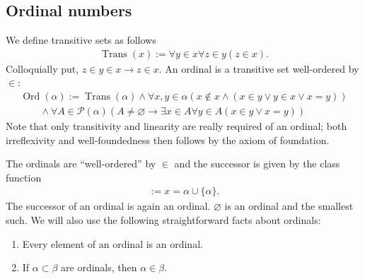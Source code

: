 \documentclass{scrartcl}
\theoremstyle{definition}
\theoremstyle{plain}
\theoremstyle{remark}
\newcommand{\limp}{\rightarrow}
\newcommand{\Pow}{\mathcal{P}}
\newcommand{\eqdef}{:=}
\DeclareMathOperator{\Trans}{Trans}
\DeclareMathOperator{\Ord}{Ord}
\begin{document}
\subsection{Ordinal numbers}
\label{subsec:ord}

We define transitive sets as follows
\begin{align*}
  \Trans(x) \eqdef \forall y \in x \forall z \in y (z \in x)\mbox{.}
\end{align*}
Colloquially put, $z \in y \in x \limp z \in x$. An ordinal is a transitive set well-ordered by $\in$:
\begin{align*}
  \Ord(\alpha) \eqdef \Trans(\alpha) \land \forall x, y \in \alpha (x \not\in x \land (x \in y \lor y \in x \lor x = y))\\
  \qquad \land \forall A \in \Pow(\alpha) (A \not= \varnothing \limp \exists x \in A \forall y \in A (x \in y \lor x = y))
\end{align*}
Note that only transitivity and linearity are really required of an ordinal; both irreflexivity and well-foundedness then follows by the axiom of foundation.

The ordinals are ``well-ordered'' by $\in$ and the successor is given by the class function
\begin{align*}
  [x = \alpha^+] \eqdef x = \alpha \cup \{\alpha\}\mbox{.}
\end{align*}
The successor of an ordinal is again an ordinal. $\varnothing$ is an ordinal and the smallest such. We will also use the following straightforward facts about ordinals:
\begin{enumerate}
\item Every element of an ordinal is an ordinal.
\item If $\alpha \subset \beta$ are ordinals, then $\alpha \in \beta$.
\end{enumerate}
\end{document}

